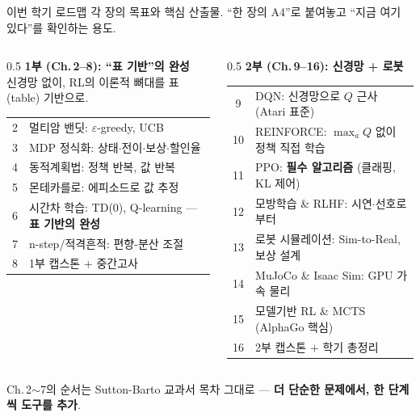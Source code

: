 \documentclass[aspectratio=169,11pt]{beamer}
\begin{document}
\begin{frame}{이번 학기 로드맵}
  각 장의 목표와 핵심 산출물. ``한 장의 A4''로 붙여놓고
  ``지금 여기 있다''를 확인하는 용도.
  \scriptsize
  \begin{columns}[T]
    \begin{column}{0.5\textwidth}
      \textbf{\color{ksablue}1부 (Ch.\,2--8): ``표 기반''의 완성} \\
      신경망 없이, RL의 이론적 뼈대를 표(table) 기반으로.
      \begin{tabular}{@{}cl@{}}
        \toprule
        2 & 멀티암 밴딧: $\varepsilon$-greedy, UCB \\
        3 & MDP 정식화: 상태$\cdot$전이$\cdot$보상$\cdot$\mbox{할인율} \\
        4 & 동적계획법: 정책 반복, 값 반복 \\
        5 & 몬테카를로: 에피소드로 값 추정 \\
        6 & 시간차 학습: TD(0), Q-learning --- \textbf{표 기반의 완성} \\
        7 & n-step/적격흔적: 편향-분산 조절 \\
        8 & 1부 캡스톤 + 중간고사 \\
        \bottomrule
      \end{tabular}
    \end{column}
    \begin{column}{0.5\textwidth}
      \textbf{\color{ksablue}2부 (Ch.\,9--16): 신경망 + 로봇} \\
      \begin{tabular}{@{}cl@{}}
        \toprule
        9 & DQN: 신경망으로 $Q$ 근사 (Atari 표준) \\
        10 & REINFORCE: $\max_a Q$ 없이 정책 직접 학습 \\
        11 & PPO: \textbf{필수 알고리즘} (클래핑, KL 제어) \\
        12 & 모방학습 \& RLHF: 시연$\cdot$선호로부터 \\
        13 & 로봇 시뮬레이션: Sim-to-Real, 보상 설계 \\
        14 & MuJoCo \& Isaac Sim: GPU 가속 물리 \\
        15 & 모델기반 RL \& MCTS (AlphaGo 핵심) \\
        16 & 2부 캡스톤 + 학기 총정리 \\
        \bottomrule
      \end{tabular}
    \end{column}
  \end{columns}
  {\footnotesize Ch.\,2$\sim$7의 순서는 Sutton-Barto 교과서 목차 그대로 ---
  \textbf{더 단순한 문제에서, 한 단계씩 도구를 추가}.}
\end{frame}
\end{document}
